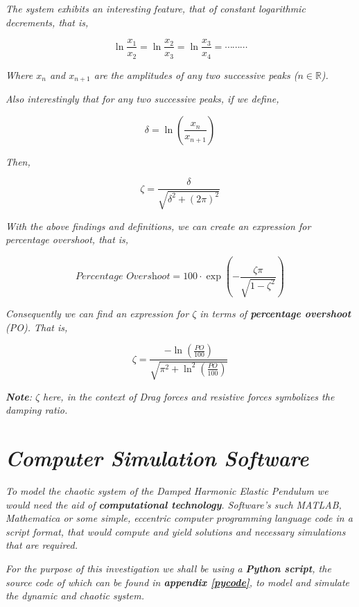     \textit{The system exhibits an interesting feature, that of constant logarithmic decrements, that is,}
            
        $$\ln{\frac{x_1}{x_2}} = \ln{\frac{x_2}{x_3}} = \ln{\frac{x_3}{x_4}} = \cdots\cdots\cdots$$
            
    \textit{Where $x_n$ and $x_{n + 1}$ are the amplitudes of any two successive peaks ($n \in \mathbb{R}$).}
            
    \textit{Also interestingly that for any two successive peaks, if we define,}
            
        $$\delta = \ln{\left(\frac{x_n}{x_{n + 1}}\right)}$$
            
    \textit{Then,}
            
        $$\zeta = \frac{\delta}{\sqrt{\delta^2 + \left(2\pi\right)^2}}$$
            
    \textit{With the above findings and definitions, we can create an expression for percentage overshoot, that is,}
            
        $$\textit{Percentage Overshoot} = 100\cdot\exp{\left(-\frac{\zeta\pi}{\sqrt{1 - \zeta^2}}\right)}$$
            
    \textit{Consequently we can find an expression for $\zeta$ in terms of \textbf{percentage overshoot} (PO). That is,}
            
        $$\zeta = \frac{-\ln{\left(\frac{PO}{100}\right)}}{\sqrt{\pi^2 + \ln^2{\left(\frac{PO}{100}\right)}}}$$
            
    \textit{\textbf{Note}: $\zeta$ here, in the context of Drag forces and resistive forces symbolizes the damping ratio.}
            
\section{\textit{Computer Simulation Software}}
        
    \textit{To model the chaotic system of the Damped Harmonic Elastic Pendulum we would need the aid of \textbf{computational technology}. Software's such MATLAB, Mathematica or some simple, eccentric computer programming language code in a script format, that would compute and yield solutions and necessary simulations that are required.}
    
    \textit{For the purpose of this investigation we shall be using a \textbf{Python script}, the source code of which can be found in \textbf{appendix \ref{pycode}}, to model and simulate the dynamic and chaotic system.}
        
        


